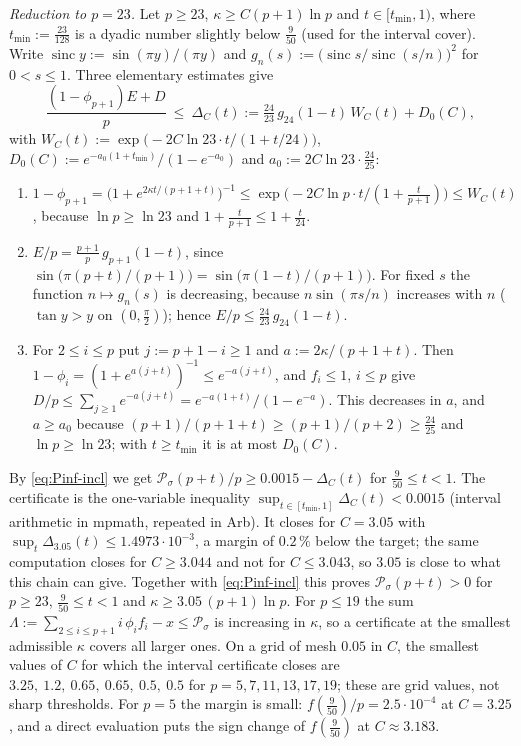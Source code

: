 \emph{Reduction to $p=23$.} Let $p\ge23$, $\kappa\ge C(p+1)\ln p$ and $t\in[t_{\min},1)$, where $t_{\min}:=\tfrac{23}{128}$ is a dyadic number slightly below $\tfrac9{50}$ (used for the interval cover). Write $\operatorname{sinc}y:=\sin(\pi y)/(\pi y)$ and $g_n(s):=\bigl(\operatorname{sinc}s/\operatorname{sinc}(s/n)\bigr)^2$ for $0<s\le1$. Three elementary estimates give
\[
\frac{(1-\phi_{p+1})E+D}{p}\ \le\ \Delta_C(t):=\tfrac{24}{23}\,g_{24}(1-t)\,W_C(t)+D_0(C),
\]
with $W_C(t):=\exp\bigl(-2C\ln23\cdot t/(1+t/24)\bigr)$, $D_0(C):=e^{-a_0(1+t_{\min})}/(1-e^{-a_0})$ and $a_0:=2C\ln23\cdot\tfrac{24}{25}$:
\begin{enumerate}
\item[(i)] $1-\phi_{p+1}=\bigl(1+e^{2\kappa t/(p+1+t)}\bigr)^{-1}\le\exp\bigl(-2C\ln p\cdot t/(1+\tfrac t{p+1})\bigr)\le W_C(t)$, because $\ln p\ge\ln23$ and $1+\tfrac t{p+1}\le1+\tfrac t{24}$.
\item[(ii)] $E/p=\tfrac{p+1}{p}\,g_{p+1}(1-t)$, since $\sin\bigl(\pi(p+t)/(p+1)\bigr)=\sin\bigl(\pi(1-t)/(p+1)\bigr)$. For fixed $s$ the function $n\mapsto g_n(s)$ is decreasing, because $n\sin(\pi s/n)$ increases with $n$ ($\tan y>y$ on $(0,\tfrac\pi2)$); hence $E/p\le\tfrac{24}{23}\,g_{24}(1-t)$.
\item[(iii)] For $2\le i\le p$ put $j:=p+1-i\ge1$ and $a:=2\kappa/(p+1+t)$. Then $1-\phi_i=(1+e^{a(j+t)})^{-1}\le e^{-a(j+t)}$, and $f_i\le1$, $i\le p$ give $D/p\le\sum_{j\ge1}e^{-a(j+t)}=e^{-a(1+t)}/(1-e^{-a})$. This decreases in $a$, and $a\ge a_0$ because $(p+1)/(p+1+t)\ge(p+1)/(p+2)\ge\tfrac{24}{25}$ and $\ln p\ge\ln23$; with $t\ge t_{\min}$ it is at most $D_0(C)$.
\end{enumerate}
By \eqref{eq:Pinf-incl} we get $\mathcal P_\sigma(p+t)/p\ge0.0015-\Delta_C(t)$ for $\tfrac9{50}\le t<1$. The certificate is the one-variable inequality $\sup_{t\in[t_{\min},1]}\Delta_C(t)<0.0015$ (interval arithmetic in mpmath, repeated in Arb). It closes for $C=3.05$ with $\sup_t\Delta_{3.05}(t)\le1.4973\cdot10^{-3}$, a margin of $0.2\,\%$ below the target; the same computation closes for $C\ge3.044$ and not for $C\le3.043$, so $3.05$ is close to what this chain can give. Together with \eqref{eq:Pinf-incl} this proves $\mathcal P_\sigma(p+t)>0$ for $p\ge23$, $\tfrac9{50}\le t<1$ and $\kappa\ge3.05\,(p+1)\ln p$. For $p\le19$ the sum $\Lambda:=\sum_{2\le i\le p+1}i\,\phi_if_i-x\le\mathcal P_\sigma$ is increasing in $\kappa$, so a certificate at the smallest admissible $\kappa$ covers all larger ones. On a grid of mesh $0.05$ in $C$, the smallest values of $C$ for which the interval certificate closes are $3.25,\ 1.2,\ 0.65,\ 0.65,\ 0.5,\ 0.5$ for $p=5,7,11,13,17,19$; these are grid values, not sharp thresholds. For $p=5$ the margin is small: $f(\tfrac9{50})/p=2.5\cdot10^{-4}$ at $C=3.25$, and a direct evaluation puts the sign change of $f(\tfrac9{50})$ at $C\approx3.183$.

